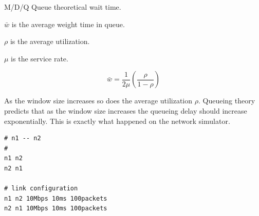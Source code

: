 \documentclass[fleqn,11pt]{article}
\begin{document}
\vspace{0.5cm}

M/D/Q Queue theoretical wait time.

$\bar{w}$ is the average weight time in queue. 

$\rho$ is the average utilization. 

$\mu$ is the service rate.

\[
    \bar{w} = \frac{1}{2\mu}\left(\frac{\rho}{1-\rho}\right)
\]

As the window size increases so does the average utilization $\rho$. 
Queueing theory predicts that as the window size increases the queueing delay should increase exponentially.
This is exactly what happened on the network simulator. 


\begin{lstlisting}[title={Network Configuration for Experiments}]
# n1 -- n2
#
n1 n2
n2 n1

# link configuration
n1 n2 10Mbps 10ms 100packets
n2 n1 10Mbps 10ms 100packets
\end{lstlisting}
\end{document}
